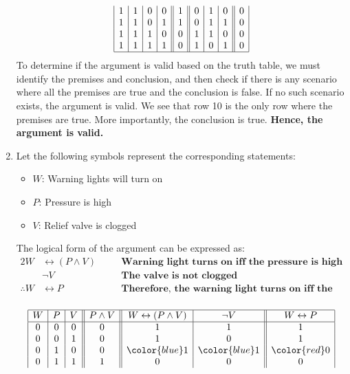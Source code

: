 \begin{enumerate}[label=(\alph*)]
\[\begin{array}{|c|c|c|c||c||c|c|c||c|}
    1 & 1 & 0 & 0 & 1 & 0 & 1 & 0 & 0 \\
    1 & 1 & 0 & 1 & 1 & 0 & 1 & 1 & 0 \\
    1 & 1 & 1 & 0 & 0 & 1 & 1 & 0 & 0 \\
    1 & 1 & 1 & 1 & 0 & 1 & 0 & 1 & 0 \\
    \hline
    \end{array}
    \]
    To determine if the argument is valid based on the truth table, we must identify the premises and conclusion, and then check if there is any scenario where all the premises are true and the conclusion is false. If no such scenario exists, the argument is valid. We see that row 10 is the only row where the premises are true. More importantly, the conclusion is true. \textbf{Hence, the argument is valid.}
    \pagebreak

    \item Let the following symbols represent the corresponding statements:
    \begin{itemize}
        \item $W$: Warning lights will turn on
        \item $P$: Pressure is high
        \item $V$: Relief valve is clogged
    \end{itemize}
    The logical form of the argument can be expressed as:
    \begin{alignat*}{2}
        W &\leftrightarrow (P \wedge V) &&\quad \textbf{Warning light turns on iff the pressure is high and the valve is clogged}\\
        &\neg V &&\quad \textbf{The valve is not clogged}\\
        \therefore W &\leftrightarrow P &&\quad \textbf{Therefore, the warning light turns on iff the pressure is too high}\\
    \end{alignat*}

    \[
    \begin{array}{|c|c|c||c||c|c||c|}
    \hline
    W & P & V & P \wedge V & W \leftrightarrow (P \wedge V) & \neg V & W \leftrightarrow P\\
    \hline
    0 & 0 & 0 & 0 & 1 & 1 & 1 \\
    0 & 0 & 1 & 0 & 1 & 0 & 1 \\
    0 & 1 & 0 & 0 & \color{blue}1 & \color{blue}1 & \color{red}0 \\
    0 & 1 & 1 & 1 & 0 & 0 & 0 \\


\end{array}\]
\end{enumerate}
